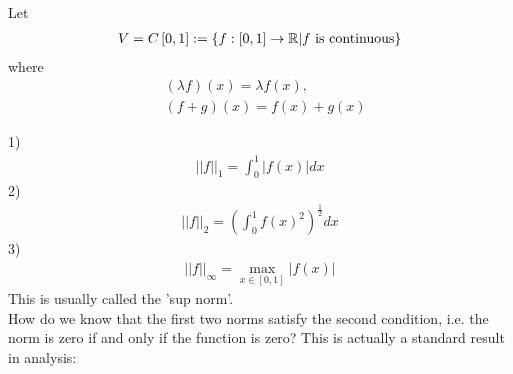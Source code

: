 \documentclass[a4paper]{article}
\begin{document}
\begin{eg}
Let
\begin{equation*}
\begin{aligned}
V=C\left[0,1\right] := \left\{ f:\left[0,1\right] \to \mathbb{R} | f \text{ is continuous} \right\}
\end{aligned}
\end{equation*}
where
\begin{equation*}
\begin{aligned}
&\left(\lambda f\right)\left(x\right) = \lambda f\left(x\right),\\
&\left(f+g\right) \left(x\right) = f\left(x\right) + g\left(x\right)
\end{aligned}
\end{equation*}
\end{eg}
1)
\begin{equation*}
\begin{aligned}
||f||_1 = \int_0^1 |f\left(x\right)| dx
\end{aligned}
\end{equation*}
2)
\begin{equation*}
\begin{aligned}
||f||_2 = \left(\int_0^1 f\left(x\right)^2\right)^\frac{1}{2} dx
\end{aligned}
\end{equation*}
3)
\begin{equation*}
\begin{aligned}
||f||_\infty = \max_{x \in \left[0,1\right]} |f\left(x\right)|
\end{aligned}
\end{equation*}
This is usually called the 'sup norm'.\\
How do we know that the first two norms satisfy the second condition, i.e. the norm is zero if and only if the function is zero? This is actually a standard result in analysis:
\end{document}
